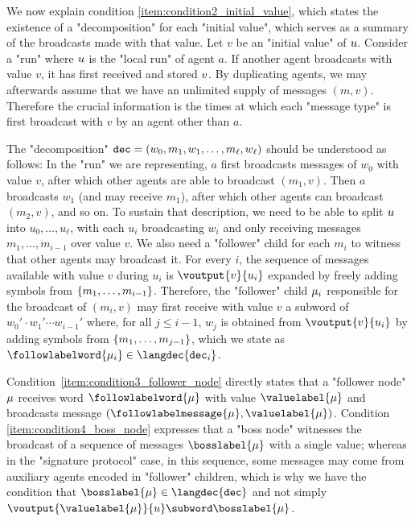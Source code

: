 We now explain condition \ref{item:condition2_initial_value}, which states the existence of a "decomposition" for each "initial value", which serves as a summary of the broadcasts made with that value. Let $v$ be an "initial value" of $u$. Consider a "run" where $u$ is the "local run" of agent $a$. If another agent broadcasts with value $v$, it has first received and stored $v$. By duplicating agents, we may afterwards assume that we have an unlimited supply of messages $(m,v)$. Therefore the crucial information is the times at which each "message type" is first broadcast with $v$ by an agent other than $a$.

The "decomposition" $\mathtt{dec} = (w_0, m_1, w_1, \ldots, m_\ell, w_\ell)$ should be understood as follows: In the "run" we are representing, $a$ first broadcasts messages of $w_0$ with value $v$, after which other agents are able to broadcast $(m_1,v)$. Then $a$ broadcasts $w_1$ (and may receive $m_1$), after which other agents can broadcast $(m_2, v)$, and so on.
To sustain that description, we need to be able to split $u$ into $u_0,\dots,u_\ell$, with each $u_i$ broadcasting $w_i$ and only receiving messages $m_1,\ldots, m_{i-1}$ over value $v$. We also need a "follower" child for each $m_i$ to witness that other agents may broadcast it.
For every $i$, the sequence of messages available with value $v$ during $u_i$ is $\voutput{v}{u_i}$ expanded by freely adding symbols from $\{m_1,\dots, m_{i-1}\}$. Therefore, the "follower" child $\mu_i$ responsible for the broadcast of $(m_i,v)$ may first receive with value $v$ a subword of $w_0' \cdot w_1' \cdots w_{i-1}'$ where, for all $j \leq i-1$, $w_j$ is obtained from $\voutput{v}{u_i}$ by adding symbols from $\{m_1, \dots, m_{j-1}\}$, which we state as $\followlabelword{\node_i} \in \langdec{\decsymb_i}$.   

Condition~\ref{item:condition3_follower_node} directly states that a "follower node" $\mu$ receives word $\followlabelword{\node}$ with value $\valuelabel{\node}$ and broadcasts message $(\followlabelmessage{\node}, \valuelabel{\node})$. Condition \ref{item:condition4_boss_node} expresses that a "boss node" witnesses the broadcast of a sequence of messages $\bosslabel{\node}$ with a single value; whereas in the "signature protocol" case, in this sequence, some messages may come from auxiliary agents encoded in "follower" children, which is why we have the condition that $\bosslabel{\node} \in \langdec{\decsymb}$ and not simply $ \voutput{\valuelabel{\node}}{\localrun} \subword \bosslabel{\node}$. 
